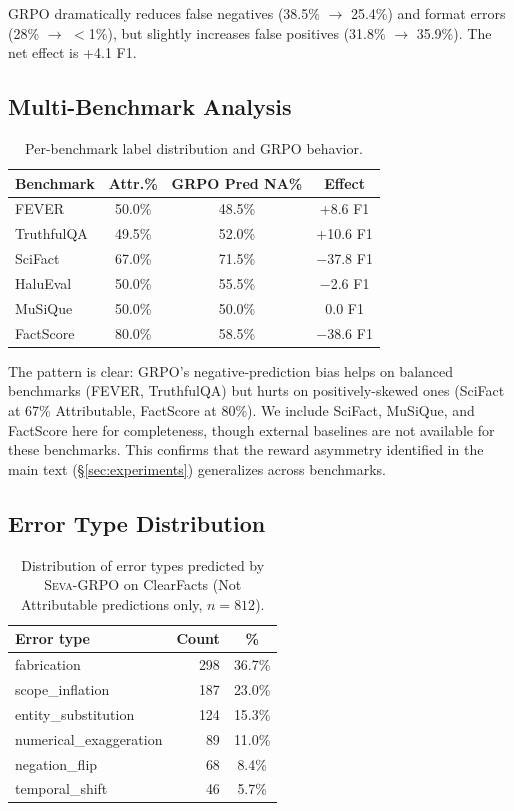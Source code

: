 \documentclass[11pt]{article}
\newcommand{\seva}{\textsc{Seva}\xspace}
\begin{document}
GRPO dramatically reduces false negatives (38.5\% $\to$ 25.4\%) and format errors (28\% $\to$ $<$1\%), but slightly increases false positives (31.8\% $\to$ 35.9\%).
The net effect is +4.1 F1.

\subsection{Multi-Benchmark Analysis}

\begin{table}[h]
\centering
\small
\caption{Per-benchmark label distribution and GRPO behavior.}
\label{tab:benchmark_analysis}
\setlength{\tabcolsep}{3pt}
\begin{tabular}{lccc}
\toprule
\textbf{Benchmark} & \textbf{Attr.\%} & \textbf{GRPO Pred NA\%} & \textbf{Effect} \\
\midrule
FEVER & 50.0\% & 48.5\% & +8.6 F1 \\
TruthfulQA & 49.5\% & 52.0\% & +10.6 F1 \\
SciFact & 67.0\% & 71.5\% & $-$37.8 F1 \\
HaluEval & 50.0\% & 55.5\% & $-$2.6 F1 \\
MuSiQue & 50.0\% & 50.0\% & 0.0 F1 \\
FactScore & 80.0\% & 58.5\% & $-$38.6 F1 \\
\bottomrule
\end{tabular}
\end{table}

The pattern is clear: GRPO's negative-prediction bias helps on balanced benchmarks (FEVER, TruthfulQA) but hurts on positively-skewed ones (SciFact at 67\% Attributable, FactScore at 80\%). We include SciFact, MuSiQue, and FactScore here for completeness, though external baselines are not available for these benchmarks.
This confirms that the reward asymmetry identified in the main text (\S\ref{sec:experiments}) generalizes across benchmarks.


\subsection{Error Type Distribution}

\begin{table}[h]
\centering
\small
\caption{Distribution of error types predicted by \seva-GRPO on ClearFacts (Not Attributable predictions only, $n{=}812$).}
\label{tab:error_dist}
\begin{tabular}{lrc}
\toprule
\textbf{Error type} & \textbf{Count} & \textbf{\%} \\
\midrule
fabrication & 298 & 36.7\% \\
scope\_inflation & 187 & 23.0\% \\
entity\_substitution & 124 & 15.3\% \\
numerical\_exaggeration & 89 & 11.0\% \\
negation\_flip & 68 & 8.4\% \\
temporal\_shift & 46 & 5.7\% \\
\bottomrule
\end{tabular}
\end{table}
\end{document}
